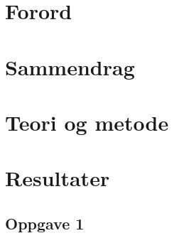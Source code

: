 \documentclass{article}
\begin{document}

\newpage


\section{Forord} %
\label{sec:forord}

\newpage



\section{Sammendrag} %
\label{sec:sammendrag}

\newpage


\label{sec:innholdsfortegnelse_og_figur_og_tabelliste}
\renewcommand{\contentsname}{Innholdsfortegnelse og figur- og tabelliste}
\tableofcontents
\newpage



\section{Teori og metode} %
\label{sec:teori}

\clearpage


\newpage

\newpage


%


\section{Resultater} %
\label{sec:resultater}


\subsection{Oppgave 1} %
\label{sub:oppgave_1}

\newpage
\end{document}
